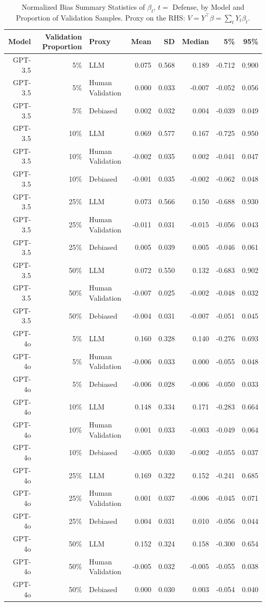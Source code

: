\begin{table}

\caption{\label{tab:unnamed-chunk-1}Normalized Bias Summary Statistics of $\beta_{t}$, $t=$ Defense, by Model and Proportion of Validation Samples.
      Proxy on the RHS: $V = Y^\top \beta = \sum_{t} Y_t \beta_t$.}
\centering
\begin{tabular}[t]{rrlrrrrr}
\toprule
Model & Validation Proportion & Proxy & Mean & SD & Median & 5\% & 95\%\\
\midrule
GPT-3.5 & 5\% & LLM & 0.075 & 0.568 & 0.189 & -0.712 & 0.900\\
GPT-3.5 & 5\% & Human Validation & 0.000 & 0.033 & -0.007 & -0.052 & 0.056\\
GPT-3.5 & 5\% & Debiased & 0.002 & 0.032 & 0.004 & -0.039 & 0.049\\
GPT-3.5 & 10\% & LLM & 0.069 & 0.577 & 0.167 & -0.725 & 0.950\\
GPT-3.5 & 10\% & Human Validation & -0.002 & 0.035 & 0.002 & -0.041 & 0.047\\
GPT-3.5 & 10\% & Debiased & -0.001 & 0.035 & -0.002 & -0.062 & 0.048\\
GPT-3.5 & 25\% & LLM & 0.073 & 0.566 & 0.150 & -0.688 & 0.930\\
GPT-3.5 & 25\% & Human Validation & -0.011 & 0.031 & -0.015 & -0.056 & 0.043\\
GPT-3.5 & 25\% & Debiased & 0.005 & 0.039 & 0.005 & -0.046 & 0.061\\
GPT-3.5 & 50\% & LLM & 0.072 & 0.550 & 0.132 & -0.683 & 0.902\\
GPT-3.5 & 50\% & Human Validation & -0.007 & 0.025 & -0.002 & -0.048 & 0.032\\
GPT-3.5 & 50\% & Debiased & -0.004 & 0.031 & -0.007 & -0.051 & 0.045\\
GPT-4o & 5\% & LLM & 0.160 & 0.328 & 0.140 & -0.276 & 0.693\\
GPT-4o & 5\% & Human Validation & -0.006 & 0.033 & 0.000 & -0.055 & 0.048\\
GPT-4o & 5\% & Debiased & -0.006 & 0.028 & -0.006 & -0.050 & 0.033\\
GPT-4o & 10\% & LLM & 0.148 & 0.334 & 0.171 & -0.283 & 0.664\\
GPT-4o & 10\% & Human Validation & 0.001 & 0.033 & -0.003 & -0.049 & 0.064\\
GPT-4o & 10\% & Debiased & -0.005 & 0.030 & -0.002 & -0.055 & 0.037\\
GPT-4o & 25\% & LLM & 0.169 & 0.322 & 0.152 & -0.241 & 0.685\\
GPT-4o & 25\% & Human Validation & 0.001 & 0.037 & -0.006 & -0.045 & 0.071\\
GPT-4o & 25\% & Debiased & 0.004 & 0.031 & 0.010 & -0.056 & 0.044\\
GPT-4o & 50\% & LLM & 0.152 & 0.324 & 0.158 & -0.300 & 0.654\\
GPT-4o & 50\% & Human Validation & -0.005 & 0.032 & -0.005 & -0.055 & 0.038\\
GPT-4o & 50\% & Debiased & 0.000 & 0.030 & 0.003 & -0.054 & 0.040\\
\bottomrule
\end{tabular}
\end{table}
